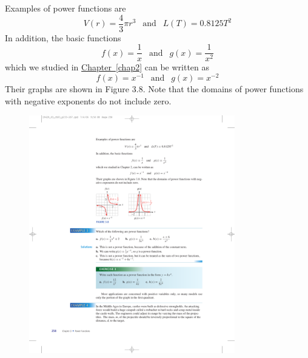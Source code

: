 \documentclass[10pt,]{book}
\theoremstyle{plain}
\theoremstyle{definition}
\theoremstyle{definition}
\theoremstyle{definition}
\theoremstyle{definition}
\theoremstyle{definition}
\numberwithin{equation}{section}
\begin{document}
    Examples of power functions are
    \begin{equation*}V(r ) = \frac{4}{3}\pi r^3 ~~\text{ and }~~L(T ) = 0.8125T^2\end{equation*}
    In addition, the basic functions
    \begin{equation*}f (x) = \frac{1}{x} ~~\text{ and }~~ g(x) = \frac{1}{x^2}\end{equation*}
    which we studied in \hyperref[chap2]{Chapter~\ref{chap2}} can be written as
    \begin{equation*}f (x) = x^{−1} ~~\text{ and }~~ g(x) = x^{−2} \end{equation*}
    Their graphs are shown in Figure 3.8. Note that the domains of power functions with negative exponents do not include zero.
    \leavevmode%
\begin{figure}
\centering
\includegraphics[width=0.80\textwidth,]{images/fig-basic-reciprocal-functions.pdf}\caption{\label{fig-basic-reciprocal-functions}}
\end{figure}
\end{document}
